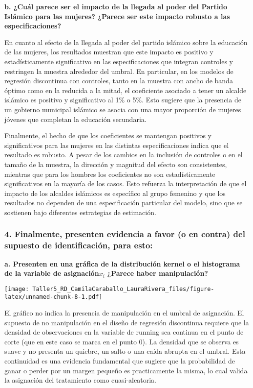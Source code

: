\documentclass[
]{article}
\begin{document}
\textbf{b. ¿Cuál parece ser el impacto de la llegada al poder del
Partido Islámico para las mujeres? ¿Parece ser este impacto robusto a
las especificaciones?}

En cuanto al efecto de la llegada al poder del partido islámico sobre la
educación de las mujeres, los resultados muestran que este impacto es
positivo y estadísticamente significativo en las especificaciones que
integran controles y restringen la muestra alrededor del umbral. En
particular, en los modelos de regresión discontinua con controles, tanto
en la muestra con ancho de banda óptimo como en la reducida a la mitad,
el coeficiente asociado a tener un alcalde islámico es positivo y
significativo al 1\% o 5\%. Esto sugiere que la presencia de un gobierno
municipal islámico se asocia con una mayor proporción de mujeres jóvenes
que completan la educación secundaria.

Finalmente, el hecho de que los coeficientes se mantengan positivos y
significativos para las mujeres en las distintas especificaciones indica
que el resultado es robusto. A pesar de los cambios en la inclusión de
controles o en el tamaño de la muestra, la dirección y magnitud del
efecto son consistentes, mientras que para los hombres los coeficientes
no son estadísticamente significativos en la mayoría de los casos. Esto
refuerza la interpretación de que el impacto de los alcaldes islámicos
es específico al grupo femenino y que los resultados no dependen de una
especificación particular del modelo, sino que se sostienen bajo
diferentes estrategias de estimación.

\subsubsection{4. Finalmente, presenten evidencia a favor (o en contra)
del supuesto de identificación, para
esto:}\label{finalmente-presenten-evidencia-a-favor-o-en-contra-del-supuesto-de-identificaciuxf3n-para-esto}

\textbf{a. Presenten en una gráfica de la distribución kernel o el
histograma de la variable de asignación}\(x_i\) \textbf{¿Parece haber
manipulación?}

\texttt{[image: Taller5\_RD\_CamilaCaraballo\_LauraRivera\_files/figure-latex/unnamed-chunk-8-1.pdf]}

El gráfico no indica la presencia de manipulación en el umbral de
asignación. El supuesto de no manipulación en el diseño de regresión
discontinua requiere que la densidad de observaciones en la variable de
running sea continua en el punto de corte (que en este caso se marca en
el punto 0). La densidad que se observa es suave y no presenta un
quiebre, un salto o una caída abrupta en el umbral. Esta continuidad es
una evidencia fundamental que sugiere que la probabilidad de ganar o
perder por un margen pequeño es practicamente la misma, lo cual valida
la asignación del tratamiento como cuasi-aleatoria.
\end{document}
